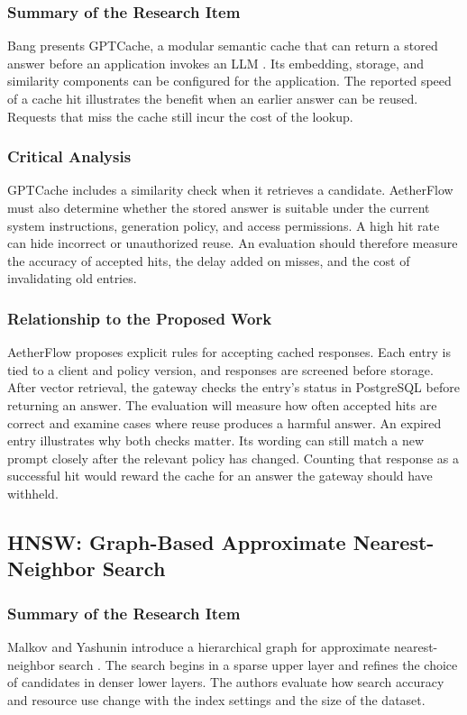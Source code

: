 \documentclass{FastFyp}
\begin{document}
\subsubsection{Summary of the Research Item}
Bang presents GPTCache, a modular semantic cache that can return a stored answer before an application invokes an LLM \cite{ref:GPTCache}. Its embedding, storage, and similarity components can be configured for the application. The reported speed of a cache hit illustrates the benefit when an earlier answer can be reused. Requests that miss the cache still incur the cost of the lookup.

\subsubsection{Critical Analysis}
GPTCache includes a similarity check when it retrieves a candidate. AetherFlow must also determine whether the stored answer is suitable under the current system instructions, generation policy, and access permissions. A high hit rate can hide incorrect or unauthorized reuse. An evaluation should therefore measure the accuracy of accepted hits, the delay added on misses, and the cost of invalidating old entries.

\subsubsection{Relationship to the Proposed Work}
AetherFlow proposes explicit rules for accepting cached responses. Each entry is tied to a client and policy version, and responses are screened before storage. After vector retrieval, the gateway checks the entry's status in PostgreSQL before returning an answer. The evaluation will measure how often accepted hits are correct and examine cases where reuse produces a harmful answer. An expired entry illustrates why both checks matter. Its wording can still match a new prompt closely after the relevant policy has changed. Counting that response as a successful hit would reward the cache for an answer the gateway should have withheld.

\subsection{HNSW: Graph-Based Approximate Nearest-Neighbor Search}
\subsubsection{Summary of the Research Item}
Malkov and Yashunin introduce a hierarchical graph for approximate nearest-neighbor search \cite{ref:HNSW}. The search begins in a sparse upper layer and refines the choice of candidates in denser lower layers. The authors evaluate how search accuracy and resource use change with the index settings and the size of the dataset.
\end{document}

